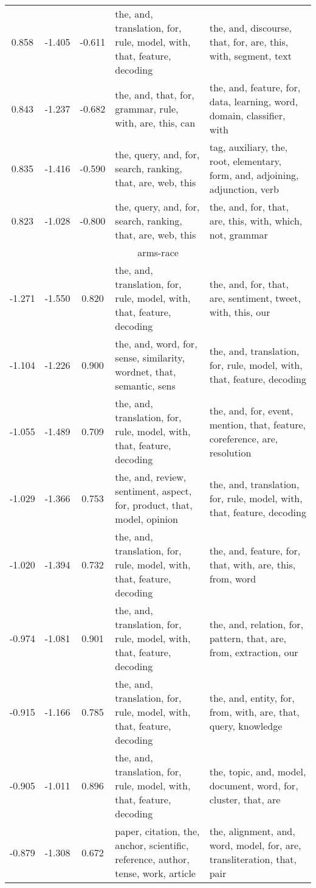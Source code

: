 \begin{tabular}{cccp{5cm}p{5cm}}
0.858 & -1.405 & -0.611 & the, and, translation, for, rule, model, with, that, feature, decoding & the, and, discourse, that, for, are, this, with, segment, text \\
0.843 & -1.237 & -0.682 & the, and, that, for, grammar, rule, with, are, this, can & the, and, feature, for, data, learning, word, domain, classifier, with \\
0.835 & -1.416 & -0.590 & the, query, and, for, search, ranking, that, are, web, this & tag, auxiliary, the, root, elementary, form, and, adjoining, adjunction, verb \\
0.823 & -1.028 & -0.800 & the, query, and, for, search, ranking, that, are, web, this & the, and, for, that, are, this, with, which, not, grammar \\
\midrule
\multicolumn{5}{c}{arms-race}\\
-1.271 & -1.550 & 0.820 & the, and, translation, for, rule, model, with, that, feature, decoding & the, and, for, that, are, sentiment, tweet, with, this, our \\
-1.104 & -1.226 & 0.900 & the, and, word, for, sense, similarity, wordnet, that, semantic, sens & the, and, translation, for, rule, model, with, that, feature, decoding \\
-1.055 & -1.489 & 0.709 & the, and, translation, for, rule, model, with, that, feature, decoding & the, and, for, event, mention, that, feature, coreference, are, resolution \\
-1.029 & -1.366 & 0.753 & the, and, review, sentiment, aspect, for, product, that, model, opinion & the, and, translation, for, rule, model, with, that, feature, decoding \\
-1.020 & -1.394 & 0.732 & the, and, translation, for, rule, model, with, that, feature, decoding & the, and, feature, for, that, with, are, this, from, word \\
-0.974 & -1.081 & 0.901 & the, and, translation, for, rule, model, with, that, feature, decoding & the, and, relation, for, pattern, that, are, from, extraction, our \\
-0.915 & -1.166 & 0.785 & the, and, translation, for, rule, model, with, that, feature, decoding & the, and, entity, for, from, with, are, that, query, knowledge \\
-0.905 & -1.011 & 0.896 & the, and, translation, for, rule, model, with, that, feature, decoding & the, topic, and, model, document, word, for, cluster, that, are \\
-0.879 & -1.308 & 0.672 & paper, citation, the, anchor, scientific, reference, author, tense, work, article & the, alignment, and, word, model, for, are, transliteration, that, pair \\

\end{tabular}
